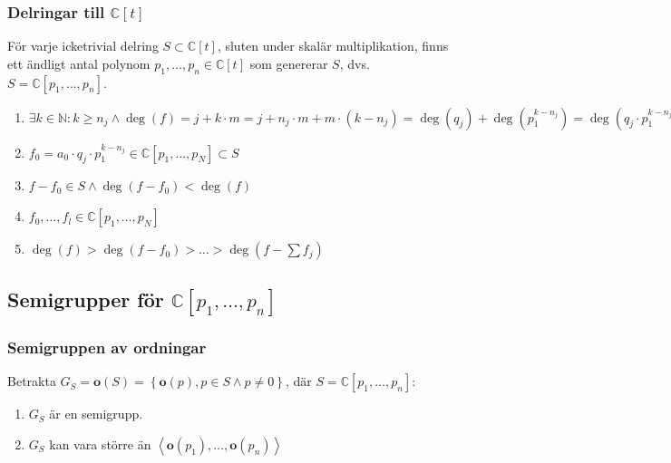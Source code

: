 \documentclass{beamer}
\begin{document}
\begin{frame}
	\frametitle{Delringar till $\mathbb{C}[t]$}
	\begin{Theorem}
		För varje icketrivial delring $S \subset \mathbb{C}[t]$, sluten under skalär multiplikation, finns ett ändligt antal polynom $p_1,\ldots,p_n \in \mathbb{C}[t]$ som genererar $S$, dvs. $S=\mathbb{C}[p_1,\ldots,p_n]$.
	\end{Theorem}
	
	\begin{enumerate}
		\item<1->$\exists k \in \mathbb{N} : k\geq n_j \wedge \deg(f) = j + k\cdot m = j + n_j\cdot m + m\cdot(k-n_j) =\deg(q_j)+\deg(p_1^{k-n_j}) = \deg(q_j\cdot p_1^{k-n_j})$
		\item<2->$f_0 = a_0\cdot q_j\cdot p_1^{k-n_j} \in \mathbb{C}[p_1,\ldots,p_N] \subset S$
		\item<3->$f-f_0 \in S \wedge \deg(f-f_0)<\deg(f)$
		\item<4->$f_0,\ldots,f_l \in \mathbb{C}[p_1,\ldots,p_N]$
		\item<5->$\deg(f)>\deg(f-f_0)>\ldots>\deg(f-\sum f_j)$
	\end{enumerate}
\end{frame}



\subsection{Semigrupper för $\mathbb{C}[p_1,\ldots,p_n]$}

\begin{frame}
	\frametitle{Semigruppen av ordningar}
	Betrakta $G_S = \mathbf{o}(S) = \left\{\mathbf{o}(p), p \in S \wedge p \neq 0 \right\}$, där $S=\mathbb{C}[p_1,\ldots,p_n]$:
	
	\begin{enumerate}
		\item<2-> $G_S$ är en semigrupp.
		\item<3-> $G_S$ kan vara större än $\left<\mathbf{o}(p_1),\ldots,\mathbf{o}(p_n)\right>$
	\end{enumerate}
		
\end{frame}
\end{document}
